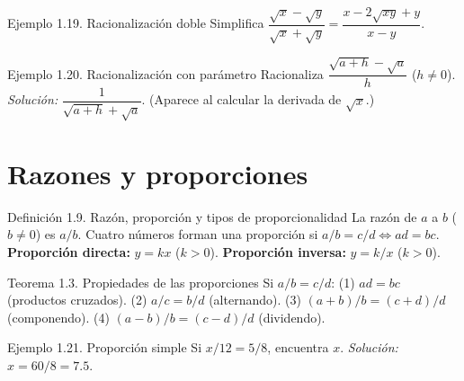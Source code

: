 \documentclass[12pt,letterpaper]{book}
\begin{document}
\begin{ejbox}{Ejemplo 1.19. Racionalización doble}
Simplifica $\dfrac{\sqrt x-\sqrt y}{\sqrt x+\sqrt y}=\dfrac{x-2\sqrt{xy}+y}{x-y}$.
\end{ejbox}

\begin{ejbox}{Ejemplo 1.20. Racionalización con parámetro}
Racionaliza $\dfrac{\sqrt{a+h}-\sqrt a}{h}$ ($h\neq0$). \textit{Solución:} $\dfrac{1}{\sqrt{a+h}+\sqrt a}$. (Aparece al calcular la derivada de $\sqrt x$.)
\end{ejbox}

\section{Razones y proporciones}

\begin{defbox}{Definición 1.9. Razón, proporción y tipos de proporcionalidad}
La razón de $a$ a $b$ ($b\neq0$) es $a/b$. Cuatro números forman una proporción si $a/b=c/d\Leftrightarrow ad=bc$.\\
\textbf{Proporción directa:} $y=kx$ ($k>0$). \textbf{Proporción inversa:} $y=k/x$ ($k>0$).
\end{defbox}

\begin{center}
\end{center}

\begin{propbox}{Teorema 1.3. Propiedades de las proporciones}
Si $a/b=c/d$: (1) $ad=bc$ (productos cruzados). (2) $a/c=b/d$ (alternando). (3) $(a+b)/b=(c+d)/d$ (componendo). (4) $(a-b)/b=(c-d)/d$ (dividendo).
\end{propbox}

\begin{ejbox}{Ejemplo 1.21. Proporción simple}
Si $x/12=5/8$, encuentra $x$. \textit{Solución:} $x=60/8=7.5$.
\end{ejbox}
\end{document}
